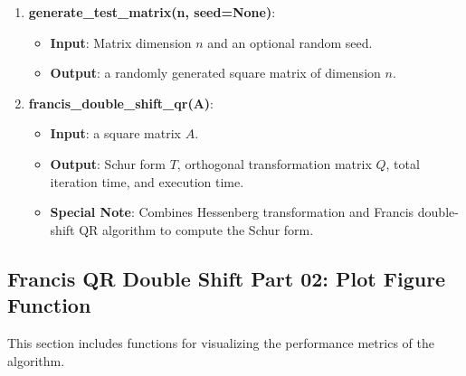 \documentclass[12pt, a4paper]{ctexart}
\begin{document}
\begin{enumerate}
    \item \textbf{generate\_test\_matrix(n, seed=None)}:
    \begin{itemize}
        \item \textbf{Input}: Matrix dimension \(n\) and an optional random seed.
        \item \textbf{Output}: a randomly generated square matrix of dimension \(n\).
    \end{itemize}

    \item \textbf{francis\_double\_shift\_qr(A)}:
    \begin{itemize}
        \item \textbf{Input}: a square matrix \(A\).
        \item \textbf{Output}: Schur form \(T\), orthogonal transformation matrix \(Q\), total iteration time, and execution time.
        \item \textbf{Special Note}: Combines Hessenberg transformation and Francis double-shift QR algorithm to compute the Schur form.
    \end{itemize}
\end{enumerate}

\subsection*{Francis QR Double Shift Part 02: Plot Figure Function}
This section includes functions for visualizing the performance metrics of the algorithm.
\end{document}
